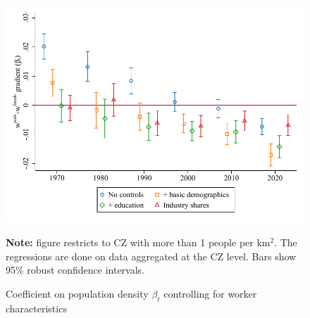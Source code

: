 \begin{figure}[!h]
\centering
\caption{Coefficient on population density $ \beta_t $ controlling for worker characteristics}
\includegraphics[width=.6\textwidth]{../2_analysis/output/figures/with_control_gradients_l_czone_pop_full_time}
\par \begin{minipage}[h]{\textwidth}{\scriptsize\textbf{Note:} figure restricts to CZ with more than 1 people per km$^2$. The regressions are done on data aggregated at the CZ level. Bars show 95\% robust confidence intervals.}\end{minipage}
\end{figure}
